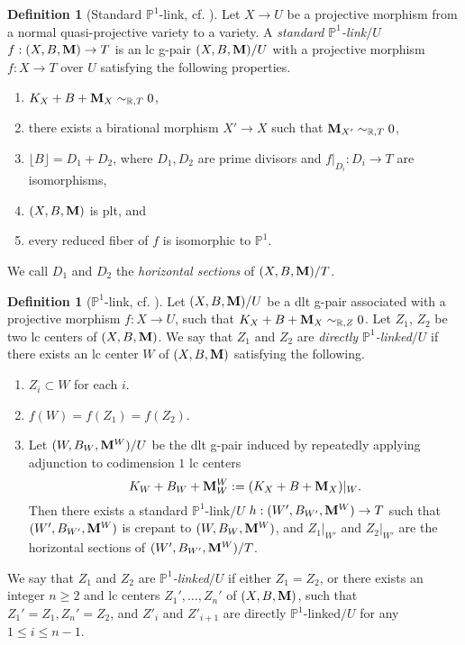 \documentclass[11pt]{amsart}
\numberwithin{equation}{section}
\newcommand{\Mm}{{\bf{M}}}
\theoremstyle{definition}
\newtheorem{defn}[thm]{Definition}
\theoremstyle{definition}
\theoremstyle{definition}
\begin{document}
\begin{defn}[Standard $\mathbb P^1$-link, cf. {\cite[Definition 2.21]{FS23}}]\label{defn: standard p1 link}
Let $X\rightarrow U$ be a projective morphism from a normal quasi-projective variety to a variety. A \emph{standard $\mathbb P^1$-link}$/U$ $f: (X,B,\Mm)\rightarrow T$ is an lc g-pair $(X,B,\Mm)/U$ with a projective morphism $f: X\to T$ over $U$ satisfying the following properties.
\begin{enumerate}
\item $K_X+B+\Mm_X\sim_{\mathbb R,T}0$,
\item there exists a birational morphism $X'\rightarrow X$ such that $\Mm_{X'}\sim_{\mathbb R,T}0$,
\item $\lfloor B\rfloor=D_1+D_2$, where $D_1,D_2$ are prime divisors and $f|_{D_i}: D_i\rightarrow T$ are isomorphisms,
\item $(X,B,\Mm)$ is plt, and
\item every reduced fiber of $f$ is isomorphic to $\mathbb P^1$.
\end{enumerate}
We call $D_1$ and $D_2$ the \emph{horizontal sections} of $(X,B,\Mm)/T$.
\end{defn}


\begin{defn}[$\mathbb P^1$-link, cf. {\cite[Definition 2.23]{FS23}}]\label{defn: p1 link}
Let $(X,B,\Mm)/U$ be a dlt g-pair associated with a projective morphism $f: X\rightarrow U$, such that $K_X+B+\Mm_X\sim_{\mathbb R,Z}0$. Let $Z_1$, $Z_2$ be two lc centers of $(X,B,\Mm)$. We say that $Z_1$ and $Z_2$ are \emph{directly $\mathbb P^1$-linked$/U$} if there exists an lc center $W$ of $(X,B,\Mm)$ satisfying the following. 
\begin{enumerate}
        \item $Z_i\subset W$ for each $i$.
        \item $f(W)=f(Z_1)=f(Z_2)$.
        \item Let $(W,B_W,\Mm^W)/U$ be the dlt g-pair induced by repeatedly applying adjunction to codimension $1$ lc centers
$$K_W+B_W+\Mm^W_W:=(K_X+B+\Mm_X)|_W.$$
        Then there exists a standard $\mathbb P^1$-link$/U$ $h: (W',B_{W'},\Mm^W)\rightarrow T$ such that $(W',B_{W'},\Mm^W)$ is crepant to $(W,B_W,\Mm^W)$, and $Z_1|_{W'}$ and $Z_2|_{W'}$ are the horizontal sections of $(W',B_{W'},\Mm^W)/T$.
\end{enumerate}
We say that $Z_1$ and $Z_2$ are \emph{$\mathbb P^1$-linked$/U$} if either $Z_1=Z_2$, or there exists an integer $n\geq 2$ and lc centers $Z_1',\dots,Z_n'$ of $(X,B,\Mm)$, such that $Z_1'=Z_1,Z_n'=Z_2$, and $Z'_i$ and $Z'_{i+1}$ are directly $\mathbb P^1$-linked$/U$ for any $1\leq i\leq n-1$.
\end{defn}
\end{document}
